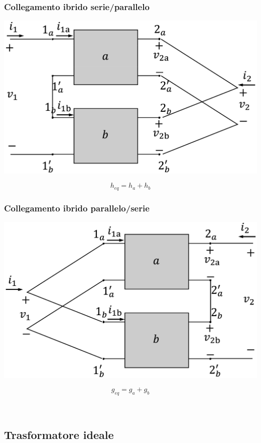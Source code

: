 \documentclass[a4paper]{article}
\begin{document}
\begin{multicols}{2}
	\columnbreak

	\subsubsection*{Collegamento ibrido serie/parallelo}
	\begin{center}
		\includegraphics[width=0.8\linewidth]{immagini/dbp_serie-parallelo.png}
	\end{center}
	\[h_{eq} = h_a + h_b\]
	
	\vspace{20pt}

	\subsubsection*{Collegamento ibrido parallelo/serie}
	\begin{center}
		\includegraphics[width=0.8\linewidth]{immagini/dbp_parallelo-serie.png}
	\end{center}
	\[g_{eq} = g_a + g_b\]
	
	\vspace{30pt}
	\(\;\) %
\end{multicols}

\newpage

\subsection{Trasformatore ideale}
\end{document}
